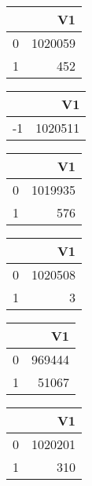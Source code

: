 \bigskip\bigskip
\centering
\begin{tabular}{rr}
  \hline
 & V1 \\ 
  \hline
0 & 1020059 \\ 
  1 & 452 \\ 
   \hline
\end{tabular}

\bigskip\bigskip
\centering
\begin{tabular}{rr}
  \hline
 & V1 \\ 
  \hline
-1 & 1020511 \\ 
   \hline
\end{tabular}

\bigskip\bigskip
\centering
\begin{tabular}{rr}
  \hline
 & V1 \\ 
  \hline
0 & 1019935 \\ 
  1 & 576 \\ 
   \hline
\end{tabular}

\bigskip\bigskip
\centering
\begin{tabular}{rr}
  \hline
 & V1 \\ 
  \hline
0 & 1020508 \\ 
  1 &   3 \\ 
   \hline
\end{tabular}

\bigskip\bigskip
\centering
\begin{tabular}{rr}
  \hline
 & V1 \\ 
  \hline
0 & 969444 \\ 
  1 & 51067 \\ 
   \hline
\end{tabular}

\bigskip\bigskip
\centering
\begin{tabular}{rr}
  \hline
 & V1 \\ 
  \hline
0 & 1020201 \\ 
  1 & 310 \\ 
   \hline
\end{tabular}

